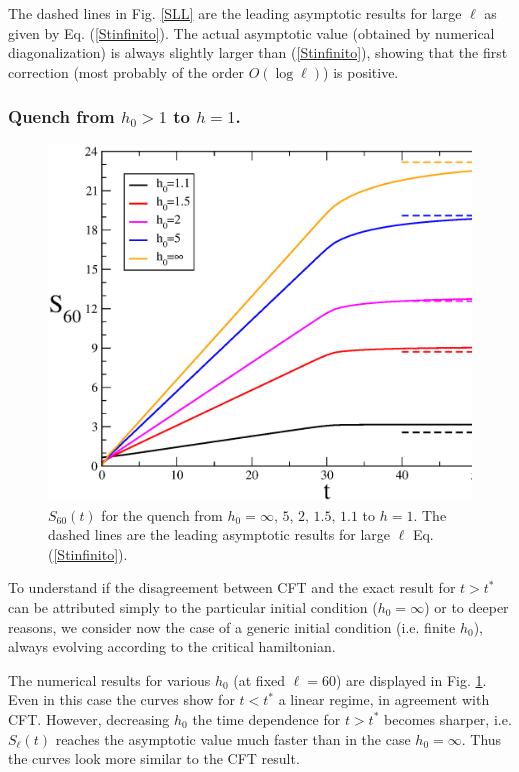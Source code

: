 \documentclass[12pt,preprint,tighten,eqsecnum,aps,floats,psfig,epsfig,amsmath,onecolumn]{revtex4-1}
\begin{document}
The dashed lines in Fig. \ref{SLL} are the leading asymptotic results for 
large $\ell$ as given by Eq. (\ref{Stinfinito}).
The actual asymptotic value (obtained by numerical diagonalization) is
always slightly larger than (\ref{Stinfinito}), showing that the first 
correction (most probably of the order $O(\log \ell)$) is positive.




\subsubsection{Quench from $h_0>1$ to $h=1$.}

\begin{figure}[t]
\centerline{\includegraphics[width=15cm]{SLh0.eps}}
\caption{$S_{60}(t)$ for the quench from 
$h_0=\infty,\,5,\,2,\,1.5,\,1.1$ to $h=1$.
The dashed lines are the leading asymptotic results for large $\ell$ 
Eq. (\ref{Stinfinito}).
}
\label{SLh0}
\end{figure}

To understand if the disagreement between CFT and the exact 
result for $t>t^*$ can be attributed simply to the particular initial 
condition ($h_0=\infty$) or to deeper reasons, we consider now the case of 
a generic initial condition (i.e. finite $h_0$), always evolving according to 
the critical hamiltonian.

The numerical results for various $h_0$ (at fixed $\ell=60$) are displayed 
in Fig. \ref{SLh0}.
Even in this case the curves show for $t<t^*$ a linear regime, in 
agreement with CFT.
However, decreasing $h_0$ the time dependence for $t>t^*$ becomes sharper, 
i.e. $S_\ell(t)$ reaches the asymptotic value much faster than 
in the case $h_0=\infty$.
Thus the curves look more similar to the CFT result.
\end{document}
